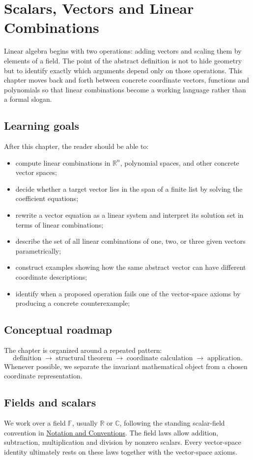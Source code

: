 \chapter{Scalars, Vectors and Linear Combinations}
\label{ch:i01-scalars-vectors-and-linear-combinations}

Linear algebra begins with two operations: adding vectors and scaling them by elements of a field. The point of the abstract definition is not to hide geometry but to identify exactly which arguments depend only on those operations. This chapter moves back and forth between concrete coordinate vectors, functions and polynomials so that linear combinations become a working language rather than a formal slogan.

\section*{Learning goals}
After this chapter, the reader should be able to:
\begin{itemize}
\item compute linear combinations in \(\mathbb R^n\), polynomial spaces, and other concrete vector spaces;
\item decide whether a target vector lies in the span of a finite list by solving the coefficient equations;
\item rewrite a vector equation as a linear system and interpret its solution set in terms of linear combinations;
\item describe the set of all linear combinations of one, two, or three given vectors parametrically;
\item construct examples showing how the same abstract vector can have different coordinate descriptions;
\item identify when a proposed operation fails one of the vector-space axioms by producing a concrete counterexample;
\end{itemize}
\section*{Conceptual roadmap}
The chapter is organized around a repeated pattern:
\[
\boxed{\text{definition}\;\longrightarrow\;\text{structural theorem}\;\longrightarrow\;\text{coordinate calculation}\;\longrightarrow\;\text{application}.}
\]
Whenever possible, we separate the invariant mathematical object from a chosen coordinate representation.

\section{Fields and scalars}
We work over a field $\mathbb F$, usually $\mathbb R$ or $\mathbb C$, following the standing scalar-field convention in \hyperref[sec:i-notation-and-conventions]{Notation and Conventions}. The field laws allow addition, subtraction, multiplication and division by nonzero scalars. Every vector-space identity ultimately rests on these laws together with the vector-space axioms.

